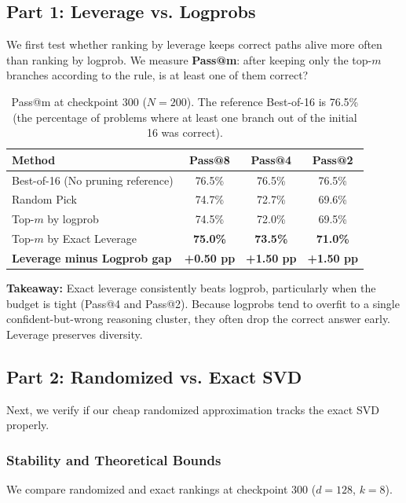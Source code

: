 \documentclass[11pt]{article}
\begin{document}
\subsection{Part 1: Leverage vs. Logprobs}

We first test whether ranking by leverage keeps correct paths alive more often than ranking by logprob. We measure \textbf{Pass@m}: after keeping only the top-$m$ branches according to the rule, is at least one of them correct?

\begin{table}[H]
\centering
\caption{Pass@m at checkpoint 300 ($N=200$). The reference Best-of-16 is 76.5\% (the percentage of problems where
 at least one branch out of the initial 16 was correct).}
\label{tab:leverage-vs-logprob}
\begin{tabular}{lccc}
\toprule
\textbf{Method} & \textbf{Pass@8} & \textbf{Pass@4} & \textbf{Pass@2} \\
\midrule
Best-of-16 (No pruning reference) & 76.5\% & 76.5\% & 76.5\% \\
\midrule
Random Pick & 74.7\% & 72.7\% & 69.6\% \\
Top-$m$ by logprob & 74.5\% & 72.0\% & 69.5\% \\
Top-$m$ by Exact Leverage & \textbf{75.0\%} & \textbf{73.5\%} & \textbf{71.0\%} \\
\midrule
\textbf{Leverage minus Logprob gap} & \textbf{+0.50 pp} & \textbf{+1.50 pp} & \textbf{+1.50 pp} \\
\bottomrule
\end{tabular}
\end{table}

\textbf{Takeaway:} Exact leverage consistently beats logprob, particularly when the budget is tight
 (Pass@4 and Pass@2). Because logprobs tend to overfit to a single confident-but-wrong reasoning cluster,
 they often drop the correct answer early. Leverage preserves diversity.

\subsection{Part 2: Randomized vs. Exact SVD}
Next, we verify if our cheap randomized approximation tracks the exact SVD properly.

\subsubsection{Stability and Theoretical Bounds}
We compare randomized and exact rankings at checkpoint 300 ($d=128$, $k=8$). 
\end{document}
